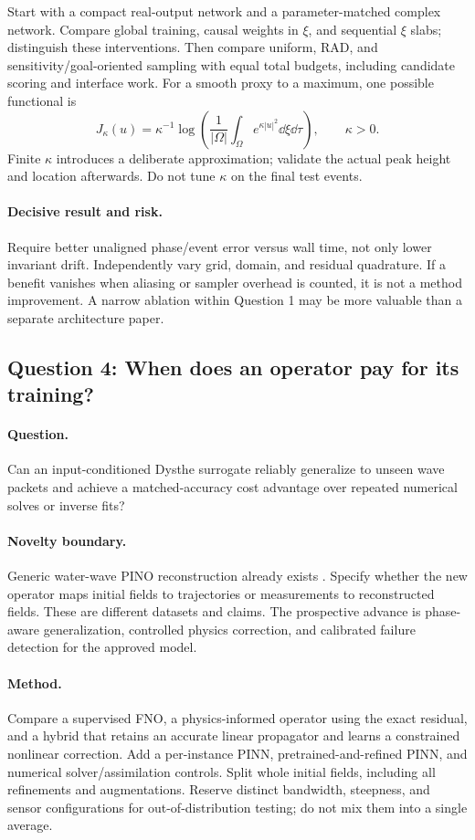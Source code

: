 Start with a compact real-output network and a parameter-matched complex
network. Compare global training, causal weights in $\xi$, and sequential
$\xi$ slabs; distinguish these interventions. Then compare uniform, RAD,
and sensitivity/goal-oriented sampling with equal total budgets, including
candidate scoring and interface work. For a smooth proxy to a maximum,
one possible functional is
\[
 J_\kappa(u)=\kappa^{-1}
  \log\left(\frac{1}{|\Omega|}\int_\Omega e^{\kappa|u|^2}\dd\xi\dd\tau\right),
 \qquad \kappa>0.
\]
Finite $\kappa$ introduces a deliberate approximation; validate the actual
peak height and location afterwards. Do not tune $\kappa$ on the final
test events.

\paragraph{Decisive result and risk.}
Require better unaligned phase/event error versus wall time, not only
lower invariant drift. Independently vary grid, domain, and residual
quadrature. If a benefit vanishes when aliasing or sampler overhead is
counted, it is not a method improvement. A narrow ablation within
Question 1 may be more valuable than a separate architecture paper.

\subsection{Question 4: When does an operator pay for its training?}
\paragraph{Question.}
Can an input-conditioned Dysthe surrogate reliably generalize to unseen
wave packets and achieve a matched-accuracy cost advantage over repeated
numerical solves or inverse fits?

\paragraph{Novelty boundary.}
Generic water-wave PINO reconstruction already exists \cite{wavepino}.
Specify whether the new operator maps initial fields to trajectories
or measurements to reconstructed fields. These are different datasets
and claims. The prospective advance is phase-aware generalization,
controlled physics correction, and calibrated failure detection for the
approved model.

\paragraph{Method.}
Compare a supervised FNO, a physics-informed operator using the exact
residual, and a hybrid that retains an accurate linear propagator and
learns a constrained nonlinear correction. Add a per-instance PINN,
pretrained-and-refined PINN, and numerical solver/assimilation controls.
Split whole initial fields, including all refinements and augmentations.
Reserve distinct bandwidth, steepness, and sensor configurations for
out-of-distribution testing; do not mix them into a single average.

